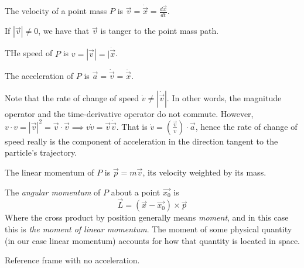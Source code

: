 \begin{definition}
  The velocity of a point mass $P$ is
  $\vec{v}=\dot{\vec{x}}=\frac{d \vec{x}}{dt}$.
  \label{def:velocity}
\end{definition}
\begin{remark}
  If $|\vec{v}|\neq 0$, we have that $\vec{v}$ is tanger to the point mass path.
\end{remark}
\begin{definition}
  THe speed of $P$ is $v=|\vec{v}|=|\dot{\vec{x}}$.
\end{definition}
\begin{definition}
  The acceleration of $P$ is $\vec{a}=\dot{\vec{v}}=\ddot{\vec{x}}$.
\end{definition}
\begin{remark}
  Note that the rate of change of speed $\dot{v} \neq |\dot{\vec{v}}|$. In other
  words, the magnitude operator and the time-derivative operator do not commute.
  However, $v\cdot v= |\vec{v}|^2 =\vec{v}\cdot\vec{v}  \implies v\dot{v}
  =\vec{v}\dot{\vec{v}}$. That is $\dot{v}= \left( \frac{\vec{v}}{v} \right)
  \cdot \vec{a}$, hence the rate of change of speed really is the component of
  acceleration in the direction tangent to the particle's trajectory.
  \label{rem:speedAndVel}
\end{remark}
\begin{definition}
  The linear momentum of $P$ is $\vec{p}=m\vec{v}$, its velocity weighted by its
  mass.
\end{definition}
\begin{definition}
  The \emph{angular momentum} of $P$ about a point $\vec{x_0}$ is 
  \[\vec{L}=(\vec{x}-\vec{x_0}) \times \vec{p}\]
  Where the cross product by position generally means \emph{moment}, and in this
  case this is \emph{the moment of linear momentum}. The moment of some
  physical quantity (in our case linear momentum) accounts for how that quantity
  is located in space.
\end{definition}
\begin{definition}
  Reference frame with no acceleration.
\end{definition}

